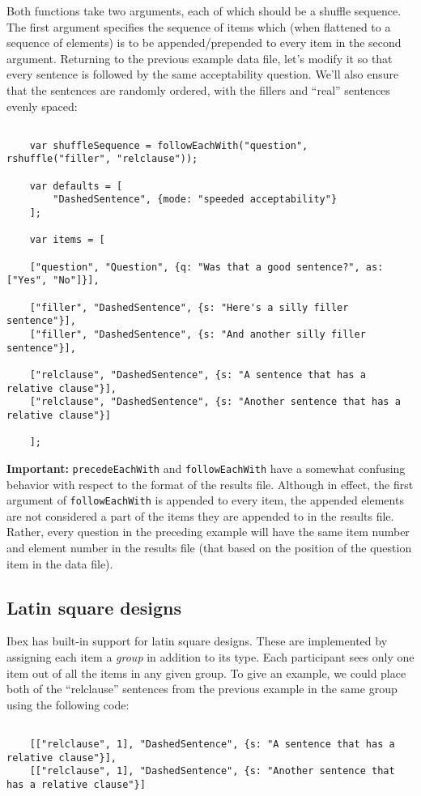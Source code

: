 \documentclass[11pt,letterpaper]{article}
\begin{document}
Both functions take two arguments, each of which should be a shuffle sequence.
The first argument specifies the sequence of items which (when flattened to a
sequence of elements) is to be appended/prepended to every item in the second
argument.  Returning to the previous example data file, let's modify it so that
every sentence is followed by the same acceptability question.  We'll also
ensure that the sentences are randomly ordered, with the fillers and ``real''
sentences evenly spaced:
\footnotesize\begin{verbatim}

    var shuffleSequence = followEachWith("question", rshuffle("filler", "relclause"));

    var defaults = [
        "DashedSentence", {mode: "speeded acceptability"}
    ];

    var items = [

    ["question", "Question", {q: "Was that a good sentence?", as: ["Yes", "No"]}],

    ["filler", "DashedSentence", {s: "Here's a silly filler sentence"}],
    ["filler", "DashedSentence", {s: "And another silly filler sentence"}],

    ["relclause", "DashedSentence", {s: "A sentence that has a relative clause"}],
    ["relclause", "DashedSentence", {s: "Another sentence that has a relative clause"}]

    ];
\end{verbatim}

\smallskip\noindent\normalsize

\textbf{Important:} \texttt{precedeEachWith} and \texttt{followEachWith} have a somewhat confusing
behavior with respect to the format of the results file. Although in effect,
the first argument of \texttt{followEachWith} is appended to every item, the appended
elements are not considered a part of the items they are appended to in the
results file. Rather, every question in the preceding example will have the
same item number and element number in the results file (that based on the
position of the question item in the data file).

\subsection{Latin square designs}

Ibex has built-in support for latin square designs. These are implemented by
assigning each item a\textit{ group}  in addition to its type. Each participant sees
only one item out of all the items in any given group. To give an example, we
could place both of the ``relclause'' sentences from the previous example in the
same group using the following code:
\footnotesize\begin{verbatim}

    [["relclause", 1], "DashedSentence", {s: "A sentence that has a relative clause"}],
    [["relclause", 1], "DashedSentence", {s: "Another sentence that has a relative clause"}]
\end{verbatim}
\end{document}
